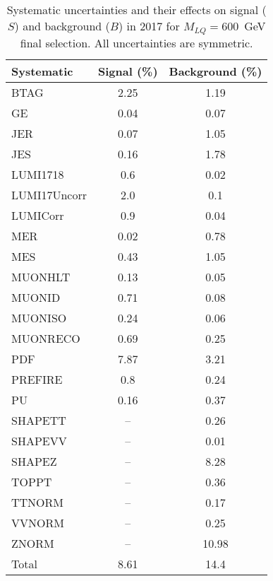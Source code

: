 \begin{table}[htbp]
\begin{center}
\caption{Systematic uncertainties and their effects on signal ($S$) and background ($B$) in 2017 for $M_{LQ}=600$~GeV final selection. All uncertainties are symmetric.}
\begin{tabular}{lcc}
\hline\hline
Systematic & Signal (\%) & Background (\%) \\ \hline 
BTAG & 2.25 & 1.19\\ 
GE & 0.04 & 0.07\\ 
JER & 0.07 & 1.05\\ 
JES & 0.16 & 1.78\\ 
LUMI1718 & 0.6 & 0.02\\ 
LUMI17Uncorr & 2.0 & 0.1\\ 
LUMICorr & 0.9 & 0.04\\ 
MER & 0.02 & 0.78\\ 
MES & 0.43 & 1.05\\ 
MUONHLT & 0.13 & 0.05\\ 
MUONID & 0.71 & 0.08\\ 
MUONISO & 0.24 & 0.06\\ 
MUONRECO & 0.69 & 0.25\\ 
PDF & 7.87 & 3.21\\ 
PREFIRE & 0.8 & 0.24\\ 
PU & 0.16 & 0.37\\ 
SHAPETT & -- & 0.26\\ 
SHAPEVV & -- & 0.01\\ 
SHAPEZ & -- & 8.28\\ 
TOPPT & -- & 0.36\\ 
TTNORM & -- & 0.17\\ 
VVNORM & -- & 0.25\\ 
ZNORM & -- & 10.98\\ 
Total & 8.61 & 14.4\\ \hline \hline
\end{tabular}
\label{tab:SysUncertainties_uujj_600}
\end{center}
\end{table}


